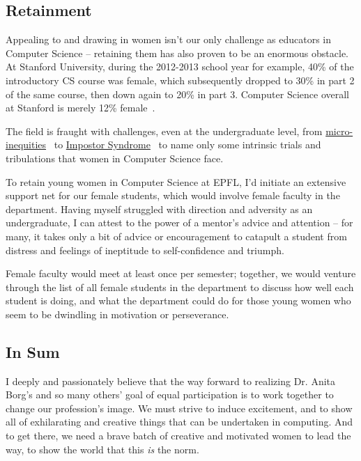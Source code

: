 \documentclass[acmtocl]{acmtrans2m}
\begin{document}

\subsection*{\textbf{Retainment}}
\vspace{-0.1in}

Appealing to and drawing in women isn't our only challenge as educators in
Computer Science -- retaining them has also proven to be an enormous obstacle.
At Stanford University, during the 2012-2013 school year for example, 40\% of
the introductory CS course was female, which subsequently dropped to 30\% in
part 2 of the same course, then down again to 20\% in part 3. Computer Science
overall at Stanford is merely 12\% female~\cite{ShePlusPlus}.

The field is fraught with challenges, even at the undergraduate level, from
\href{http://www.pgbovine.net/tech-privilege.htm}{micro-inequities}~\cite{MicroInequities} to
\href{http://www.networkworld.com/news/2012/061312-gmail-women-260169.html}{Impostor Syndrome}~\cite{ImpostorSyndrome}
to name only some intrinsic trials and tribulations that women in Computer
Science face.

To retain young women in Computer Science at EPFL, I'd initiate an extensive
support net for our female students, which would involve female faculty in the
department. Having myself struggled with direction and adversity as an
undergraduate, I can attest to the power of a mentor's advice and attention --
for many, it takes only a bit of advice or encouragement to catapult a
student from distress and feelings of ineptitude to self-confidence and
triumph.

Female faculty would meet at least once per semester; together, we would
venture through the list of all female students in the department to discuss
how well each student is doing, and what the department could do for those
young women who seem to be dwindling in motivation or perseverance.

\subsection*{\textbf{In Sum}}
\vspace{-0.1in}

I deeply and passionately believe that the way forward to realizing Dr. Anita
Borg's and so many others' goal of equal participation is to work together to
change our profession's image. We must strive to induce excitement, and to
show all of exhilarating and creative things that can be undertaken in
computing. And to get there, we need a brave batch of creative and motivated
women to lead the way, to show the world that this \textit{is} the norm.
\end{document}
